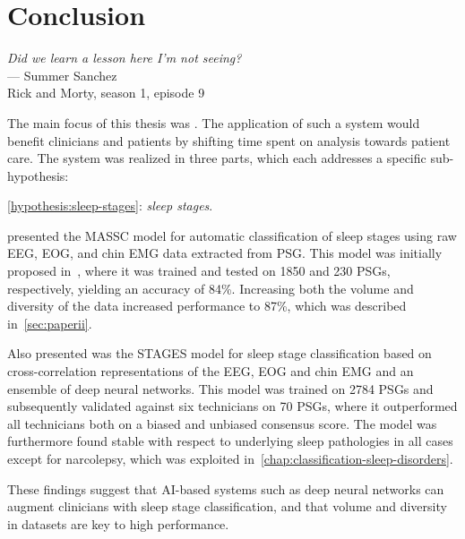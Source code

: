 \chapter{Conclusion}\label{chap:conclusion}
\begin{flushright}{\slshape 
        Did we learn a lesson here I'm not seeing?} \\ \medskip
        --- Summer Sanchez\\Rick and Morty, season 1, episode 9
\end{flushright}

\vspace{6cm}

The main focus of this thesis was \emph{\objective}.
The application of such a system would benefit clinicians and patients by shifting time spent on analysis towards patient care.
The system was realized in three parts, which each addresses a specific sub-hypothesis:

\bigskip
\noindent \ref{hypothesis:sleep-stages}: \textit{\hypothesis\xspace sleep stages}.

 presented the \ac{MASSC} model for automatic classification of sleep stages using raw \ac{EEG}, \ac{EOG}, and chin \ac{EMG} data extracted from \ac{PSG}.
This model was initially proposed in~\cite{Olesen2018c}, where it was trained and tested on 1850 and 230 \acp{PSG}, respectively, yielding an accuracy of 84\%. 
Increasing both the volume and diversity of the data increased performance to 87\%, which was described in~\cref{sec:paperii}.

Also presented was the \ac{STAGES} model for sleep stage classification based on cross-correlation representations of the \ac{EEG}, \ac{EOG} and chin \ac{EMG} and an ensemble of deep neural networks.
This model was trained on 2784 \acp{PSG} and subsequently validated against six technicians on 70 \acp{PSG}, where it outperformed all technicians both on a biased and unbiased consensus score.
The model was furthermore found stable with respect to underlying sleep pathologies in all cases except for narcolepsy, which was exploited in~\cref{chap:classification-sleep-disorders}.

These findings suggest that \ac{AI}-based systems such as deep neural networks can augment clinicians with sleep stage classification, and that volume and diversity in datasets are key to high performance.

